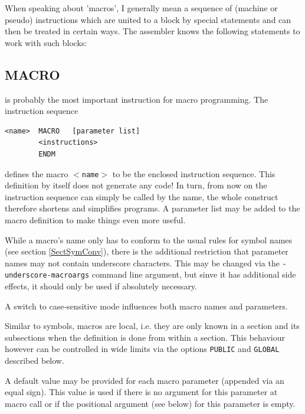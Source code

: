 \documentclass[12pt,twoside]{report}
\makeatletter
\newcommand{\tty}[1]{{\tt #1}}
\newcommand{\ttindex}[1]{\index{#1@{\tt #1}}}
\makeatother
\begin{document}
When speaking about 'macros', I generally mean a sequence of (machine
or pseudo) instructions which are united to a block by special
statements and can then be treated in certain ways.  The assembler
knows the following statements to work with such blocks:


\subsection{MACRO}
\ttindex{MACRO}\ttindex{ENDM}
\label{SectMacros}

is probably the most important instruction for macro programming.
The instruction sequence
\begin{verbatim}
<name>  MACRO   [parameter list]
        <instructions>
        ENDM
\end{verbatim}
defines the macro \tty{$<$name$>$} to be the enclosed instruction sequence.
This definition by itself does not generate any code!  In turn, from
now on the instruction sequence can simply be called by the name, the
whole construct therefore shortens and simplifies programs.  A
parameter list may be added to the macro definition to make things
even more useful.
\par
While a macro's name only has to conform to the usual rules for symbol
names (see section \ref{SectSymConv}), there is the additional restriction
that parameter names may not contain underscore characters.  This may
be changed via the \tty{-underscore-macroargs} command line argument,
but sinve it has additional side effects, it should only be used if
absolutely necessary.
\par
A switch to case-sensitive mode influences both macro names and
parameters.

Similar to symbols, macros are local, i.e. they are only known in a
section and its subsections when the definition is done from within
a section.  This behaviour however can be controlled in wide limits
via the options \tty{PUBLIC} and \tty{GLOBAL} described below.

A default value may be provided for each macro parameter
(appended via an equal sign).  This value is used if there is no
argument for this parameter at macro call or if the positional
argument (see below) for this parameter is empty.
\end{document}
